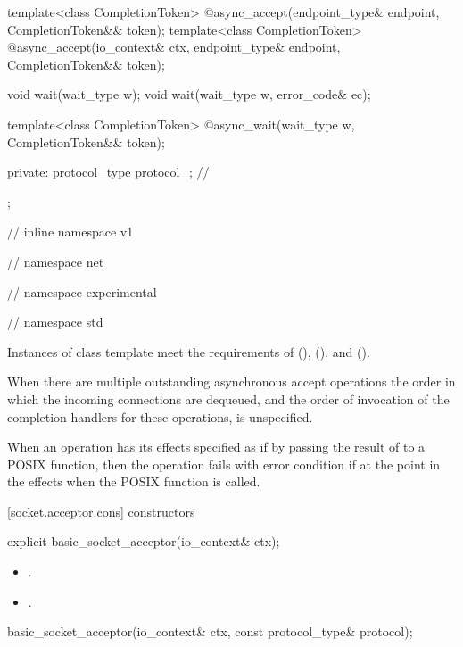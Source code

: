 \begin{codeblock}
{{{{{    template<class CompletionToken>
      @\DEDUCED@ async_accept(endpoint_type& endpoint,
                           CompletionToken&& token);
    template<class CompletionToken>
      @\DEDUCED@ async_accept(io_context& ctx, endpoint_type& endpoint,
                           CompletionToken&& token);

    void wait(wait_type w);
    void wait(wait_type w, error_code& ec);

    template<class CompletionToken>
      @\DEDUCED@ async_wait(wait_type w, CompletionToken&& token);

  private:
    protocol_type protocol_; // \expos
  };

} // inline namespace v1
} // namespace net
} // namespace experimental
} // namespace std
\end{codeblock}

\pnum
Instances of class template  meet the requirements of  (),  (), and  ().

\pnum
 When there are multiple outstanding asynchronous accept operations the order in which the incoming connections are dequeued, and the order of invocation of the completion handlers for these operations, is unspecified.

\pnum
When an operation has its effects specified as if by passing the result of  to a POSIX function, then the operation fails with error condition  if  at the point in the effects when the POSIX function is called.


[socket.acceptor.cons]{ constructors}

\begin{itemdecl}
explicit basic_socket_acceptor(io_context& ctx);
\end{itemdecl}

\begin{itemdescr}
\pnum
\postconditions
\begin{itemize}
\item
{}.
\item
{}.
\end{itemize}
\end{itemdescr}

\begin{itemdecl}
basic_socket_acceptor(io_context& ctx, const protocol_type& protocol);
\end{itemdecl}

